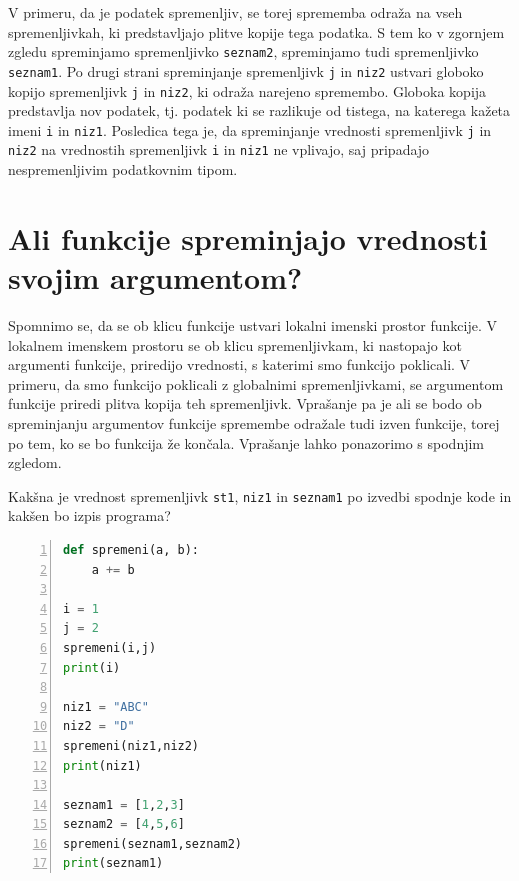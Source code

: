 V primeru, da je podatek spremenljiv, se torej sprememba odraža na vseh spremenljivkah, ki predstavljajo plitve kopije tega podatka. S tem ko v zgornjem zgledu spreminjamo spremenljivko \texttt{seznam2}, spreminjamo tudi spremenljivko \texttt{seznam1}. Po drugi strani spreminjanje spremenljivk \texttt{j} in \texttt{niz2} ustvari globoko kopijo spremenljivk \texttt{j} in \texttt{niz2}, ki odraža narejeno spremembo. Globoka kopija predstavlja nov podatek, tj. podatek ki se razlikuje od tistega, na katerega kažeta imeni \texttt{i} in \texttt{niz1}. Posledica tega je, da spreminjanje vrednosti spremenljivk \texttt{j} in \texttt{niz2} na vrednostih spremenljivk \texttt{i} in \texttt{niz1} ne vplivajo, saj pripadajo nespremenljivim podatkovnim tipom.

\section{Ali funkcije spreminjajo vrednosti svojim argumentom?}
Spomnimo se, da se ob klicu funkcije ustvari lokalni imenski prostor funkcije. V lokalnem imenskem prostoru se ob klicu spremenljivkam, ki nastopajo kot argumenti funkcije, priredijo vrednosti, s katerimi smo funkcijo poklicali. V primeru, da smo funkcijo poklicali z globalnimi spremenljivkami, se argumentom funkcije priredi plitva kopija teh spremenljivk. Vprašanje pa je ali se bodo ob spreminjanju argumentov funkcije spremembe odražale tudi izven funkcije, torej po tem, ko se bo funkcija že končala. Vprašanje lahko ponazorimo s spodnjim zgledom.

\begin{zgled}
Kakšna je vrednost spremenljivk \texttt{st1}, \texttt{niz1} in \texttt{seznam1} po izvedbi spodnje kode in kakšen bo izpis programa?
\begin{lstlisting}[language=Python, showstringspaces=false,numbers=left]
def spremeni(a, b):
    a += b

i = 1
j = 2
spremeni(i,j)
print(i)

niz1 = "ABC"
niz2 = "D"
spremeni(niz1,niz2)
print(niz1)

seznam1 = [1,2,3]
seznam2 = [4,5,6]
spremeni(seznam1,seznam2)
print(seznam1)
\end{lstlisting}
\end{zgled}

